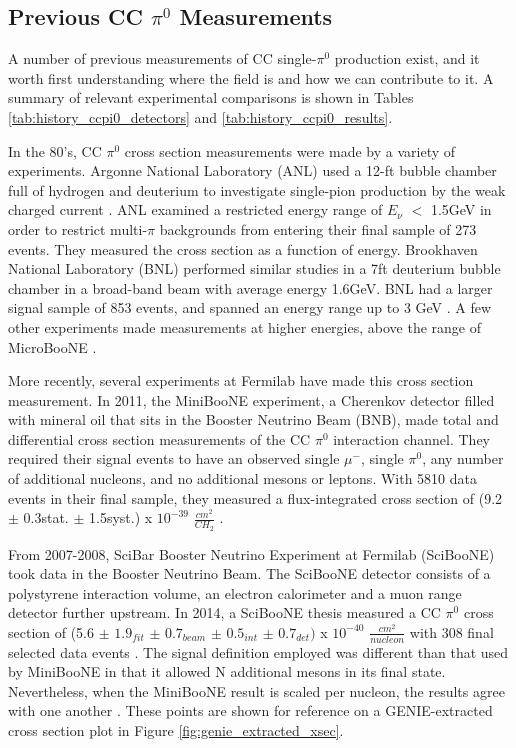 \subsection{Previous CC $\pi^0$ Measurements}
A number of previous measurements of CC single-$\pi^0$ production exist, and it worth first understanding where the field is and how we can contribute to it. A summary of relevant experimental comparisons is shown in Tables \ref{tab:history_ccpi0_detectors} and \ref{tab:history_ccpi0_results}.
\par In the 80's, CC $\pi^0$ cross section measurements were made by a variety of experiments.  Argonne National Laboratory (ANL) used a 12-ft bubble chamber full of hydrogen and deuterium to investigate single-pion production by the weak charged current \cite{bib:ANL1}. ANL examined a restricted energy range of $E_\nu$ $<$ 1.5GeV in order to restrict multi-$\pi$ backgrounds from entering their final sample of 273 events. They measured the cross section as a function of energy. Brookhaven National Laboratory (BNL) performed similar studies in a 7ft deuterium bubble chamber in a broad-band beam with average energy 1.6GeV. BNL had a larger signal sample of 853 events, and spanned an energy range up to 3 GeV \cite{bib:ANL2} \cite{bib:BNL}. A few other experiments made measurements at higher energies, above the range of MicroBooNE \cite{bib:HE_unknown1} \cite{bib:HE_unknown2}.
\par More recently, several experiments at Fermilab have made this cross section measurement. In 2011, the MiniBooNE experiment, a Cherenkov detector filled with mineral oil that sits in the Booster Neutrino Beam (BNB), made total and differential cross section measurements of the CC $\pi^0$ interaction channel. They required their signal events to have an observed single $\mu^-$, single $\pi^0$, any number of additional nucleons, and no additional mesons or leptons. With 5810 data events in their final sample, they measured a flux-integrated cross section of (9.2 $\pm$ 0.3stat. $\pm$ 1.5syst.) x $10^{-39}$ $\frac{cm^2}{CH_2}$ \cite{bib:numucc_miniboone} \cite{bib:miniboone_thesis}.  
\par From 2007-2008, SciBar Booster Neutrino Experiment at Fermilab (SciBooNE) took data in the Booster Neutrino Beam. The SciBooNE detector consists of a polystyrene interaction volume, an electron calorimeter and a muon range detector further upstream.  In 2014, a SciBooNE thesis measured a CC $\pi^0$ cross section of (5.6 $\pm$ $1.9_{fit}$ $\pm$ $0.7_{beam}$ $\pm$ $0.5_{int}$ $\pm$ $0.7_{det})$ x $10^{-40}$ $\frac{cm^2}{nucleon}$ with 308 final selected data events \cite{bib:sciboone_thesis}. The signal definition employed was different than that used by MiniBooNE in that it allowed N additional mesons in its final state.  Nevertheless, when the MiniBooNE result is scaled per nucleon, the results agree with one another .  These points are shown for reference on a GENIE-extracted cross section plot in Figure \ref{fig:genie_extracted_xsec}.  
